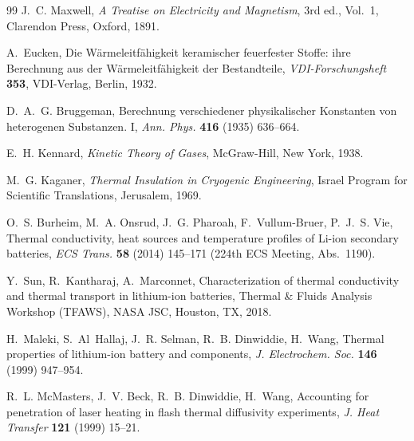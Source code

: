 \documentclass[10pt,a4paper]{article}
\begin{document}
\begin{thebibliography}{99}
J.~C. Maxwell,
\emph{A Treatise on Electricity and Magnetism}, 3rd ed., Vol.~1,
Clarendon Press, Oxford, 1891.

A.~Eucken,
Die W\"armeleitf\"ahigkeit keramischer feuerfester Stoffe: ihre Berechnung aus der W\"armeleitf\"ahigkeit der Bestandteile,
\emph{VDI-Forschungsheft} \textbf{353}, VDI-Verlag, Berlin, 1932.

D.~A.~G. Bruggeman,
Berechnung verschiedener physikalischer Konstanten von heterogenen Substanzen. I,
\emph{Ann. Phys.} \textbf{416} (1935) 636--664.

E.~H. Kennard,
\emph{Kinetic Theory of Gases},
McGraw-Hill, New York, 1938.

M.~G. Kaganer,
\emph{Thermal Insulation in Cryogenic Engineering},
Israel Program for Scientific Translations, Jerusalem, 1969.

O.~S. Burheim, M.~A. Onsrud, J.~G. Pharoah, F.~Vullum-Bruer, P.~J.~S. Vie,
Thermal conductivity, heat sources and temperature profiles of Li-ion secondary batteries,
\emph{ECS Trans.} \textbf{58} (2014) 145--171 (224th ECS Meeting, Abs.~1190).

Y.~Sun, R.~Kantharaj, A.~Marconnet,
Characterization of thermal conductivity and thermal transport in lithium-ion batteries,
Thermal \& Fluids Analysis Workshop (TFAWS), NASA JSC, Houston, TX, 2018.

H.~Maleki, S.~Al~Hallaj, J.~R. Selman, R.~B. Dinwiddie, H.~Wang,
Thermal properties of lithium-ion battery and components,
\emph{J. Electrochem. Soc.} \textbf{146} (1999) 947--954.

R.~L. McMasters, J.~V. Beck, R.~B. Dinwiddie, H.~Wang,
Accounting for penetration of laser heating in flash thermal diffusivity experiments,
\emph{J. Heat Transfer} \textbf{121} (1999) 15--21.

\end{thebibliography}
\end{document}
